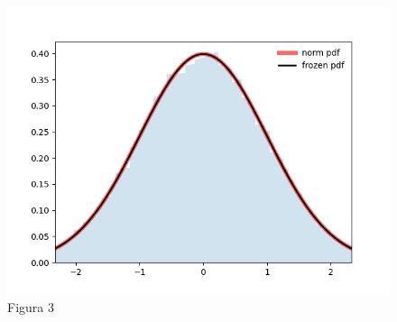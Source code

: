 \documentclass[
  letterpaper,
  DIV=11,
  numbers=noendperiod]{scrreprt}
\begin{document}
\begin{figure}

{\centering \includegraphics{Figure_3.png}

}

\caption{Figura 3}

\end{figure}
\end{document}
